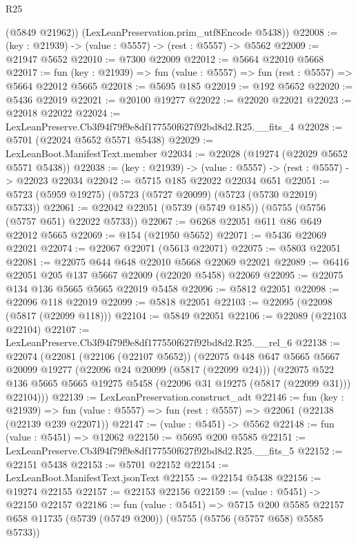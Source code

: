 \begin{lexlean}{R25}
\begin{coremodule}
        (@5849 @21962))
      (LexLeanPreservation.prim_utf8Encode @5438))
@22008 := (key : @21939) -> (value : @5557) -> (rest : @5557) -> @5562
@22009 := @21947 @5652
@22010 := @7300 @22009
@22012 := @5664 @22010 @5668
@22017 := fun (key : @21939) => fun (value : @5557) => fun (rest : @5557) => @5664 @22012 @5665
@22018 := @5695 @185
@22019 := @192 @5652
@22020 := @5436 @22019
@22021 := @20100 @19277
@22022 := @22020 @22021
@22023 := @22018 @22022
@22024 := LexLeanPreserve.Cb3f94f79f9e8df177550f627f92bd8d2.R25.__fits_4
@22028 := @5701 (@22024 @5652 @5571 @5438)
@22029 := LexLeanBoot.ManifestText.member
@22034 := @22028 (@19274 (@22029 @5652 @5571 @5438))
@22038 := (key : @21939) -> (value : @5557) -> (rest : @5557) -> @22023 @22034
@22042 := @5715 @185 @22022 @22034 @651
@22051 := @5723 (@5959 @19275) (@5723 (@5727 @20099) (@5723 (@5730 @22019) @5733))
@22061 := @22042 @22051 (@5739 (@5749 @185)) (@5755 (@5756 (@5757 @651) @22022 @5733))
@22067 := @6268 @22051 @611 @86 @649 @22012 @5665
@22069 := @154 (@21950 @5652)
@22071 := @5436 @22069 @22021
@22074 := @22067 @22071 (@5613 @22071)
@22075 := @5803 @22051
@22081 := @22075 @644 @648 @22010 @5668 @22069 @22021
@22089 := @6416 @22051 @205 @137 @5667 @22009 (@22020 @5458) @22069
@22095 := @22075 @134 @136 @5665 @5665 @22019 @5458
@22096 := @5812 @22051
@22098 := @22096 @118 @22019
@22099 := @5818 @22051
@22103 := @22095 (@22098 (@5817 (@22099 @118)))
@22104 := @5849 @22051
@22106 := @22089 (@22103 @22104)
@22107 := LexLeanPreserve.Cb3f94f79f9e8df177550f627f92bd8d2.R25.__rel_6
@22138 := @22074
    (@22081
      (@22106 (@22107 @5652))
      (@22075
        @448
        @647
        @5665
        @5667
        @20099
        @19277
        (@22096 @24 @20099 (@5817 (@22099 @24)))
        (@22075
          @522
          @136
          @5665
          @5665
          @19275
          @5458
          (@22096 @31 @19275 (@5817 (@22099 @31)))
          @22104)))
@22139 := LexLeanPreservation.construct_adt
@22146 := fun (key : @21939) =>
  fun (value : @5557) => fun (rest : @5557) => @22061 (@22138 (@22139 @239 @22071))
@22147 := (value : @5451) -> @5562
@22148 := fun (value : @5451) => @12062
@22150 := @5695 @200 @5585
@22151 := LexLeanPreserve.Cb3f94f79f9e8df177550f627f92bd8d2.R25.__fits_5
@22152 := @22151 @5438
@22153 := @5701 @22152
@22154 := LexLeanBoot.ManifestText.jsonText
@22155 := @22154 @5438
@22156 := @19274 @22155
@22157 := @22153 @22156
@22159 := (value : @5451) -> @22150 @22157
@22186 := fun (value : @5451) =>
  @5715
    @200
    @5585
    @22157
    @658
    @11735
    (@5739 (@5749 @200))
    (@5755 (@5756 (@5757 @658) @5585 @5733))

\end{coremodule}
\end{lexlean}
